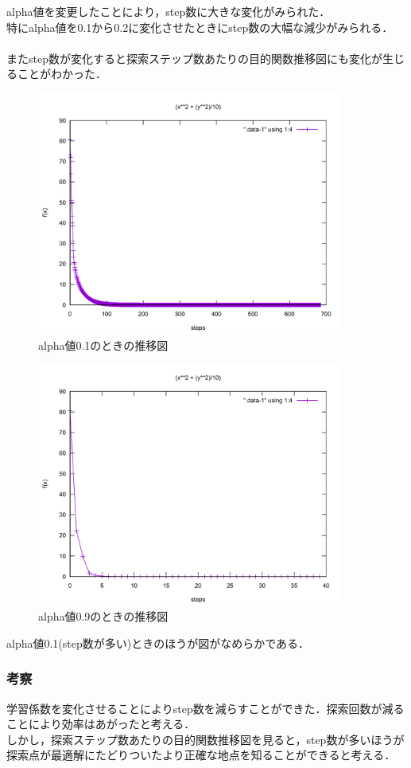 alpha値を変更したことにより，step数に大きな変化がみられた．\\
特にalpha値を0.1から0.2に変化させたときにstep数の大幅な減少がみられる．\\\\

またstep数が変化すると探索ステップ数あたりの目的関数推移図にも変化が生じることがわかった．\\

\begin{figure}[h]
 \begin{center}
  \includegraphics[width=10.0cm]{figs/level2.2/sim-1-2.pdf}
  \caption{alpha値0.1のときの推移図}
	\label{step_alpha}
 \end{center}
\end{figure}

\begin{figure}[h]
 \begin{center}
  \includegraphics[width=10.0cm]{figs/level2.2/sim-1.pdf}
  \caption{alpha値0.9のときの推移図}
	\label{step_alpha}
 \end{center}
\end{figure}

alpha値0.1(step数が多い)ときのほうが図がなめらかである．

\subsubsection{考察}

学習係数を変化させることによりstep数を減らすことができた．探索回数が減ることにより効率はあがったと考える．\\
しかし，探索ステップ数あたりの目的関数推移図を見ると，step数が多いほうが探索点が最適解にたどりついたより正確な地点を知ることができると考える．



